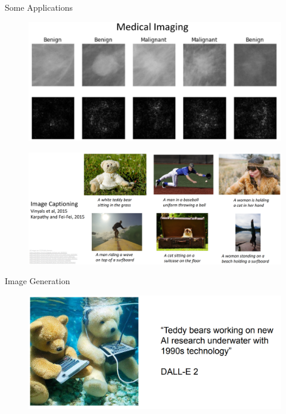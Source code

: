 \documentclass[10pt]{beamer}
\theoremstyle{remark}
\theoremstyle{definition}
\begin{document}
\begin{frame}[allowframebreaks]{Some Applications}
\framebreak

\begin{figure}
\centering
\includegraphics[width=1.0\textwidth,height=0.9\textheight,keepaspectratio]{./images/cv_9.png}
\end{figure}

\framebreak

\begin{figure}
\centering
\includegraphics[width=1.0\textwidth,height=0.9\textheight,keepaspectratio]{./images/cv_10.png}
\end{figure}

\framebreak

\centering
Image Generation
\begin{figure}
\centering
\includegraphics[width=1.0\textwidth,height=0.9\textheight,keepaspectratio]{./images/cv_11.png}
\end{figure}


\end{frame}
\end{document}
